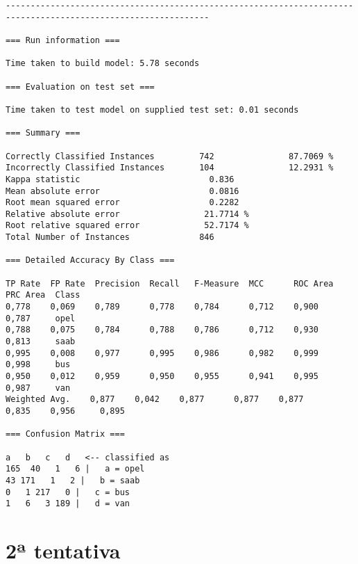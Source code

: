 \documentclass[
	article,			%
	11pt,				%
	oneside,			%
	a4paper,			%
	english,			%
	brazil,				%
	sumario=tradicional
	]{abntex2}
\begin{document}
\begin{lstlisting}
---------------------------------------------------------------------------------------------------------------

=== Run information ===

Time taken to build model: 5.78 seconds

=== Evaluation on test set ===

Time taken to test model on supplied test set: 0.01 seconds

=== Summary ===

Correctly Classified Instances         742               87.7069 %
Incorrectly Classified Instances       104               12.2931 %
Kappa statistic                          0.836 
Mean absolute error                      0.0816
Root mean squared error                  0.2282
Relative absolute error                 21.7714 %
Root relative squared error             52.7174 %
Total Number of Instances              846     

=== Detailed Accuracy By Class ===

TP Rate  FP Rate  Precision  Recall   F-Measure  MCC      ROC Area  PRC Area  Class
0,778    0,069    0,789      0,778    0,784      0,712    0,900     0,787     opel
0,788    0,075    0,784      0,788    0,786      0,712    0,930     0,813     saab
0,995    0,008    0,977      0,995    0,986      0,982    0,999     0,998     bus
0,950    0,012    0,959      0,950    0,955      0,941    0,995     0,987     van
Weighted Avg.    0,877    0,042    0,877      0,877    0,877      0,835    0,956     0,895     

=== Confusion Matrix ===

a   b   c   d   <-- classified as
165  40   1   6 |   a = opel
43 171   1   2 |   b = saab
0   1 217   0 |   c = bus
1   6   3 189 |   d = van

\end{lstlisting}

\section{2ª tentativa}
\end{document}
